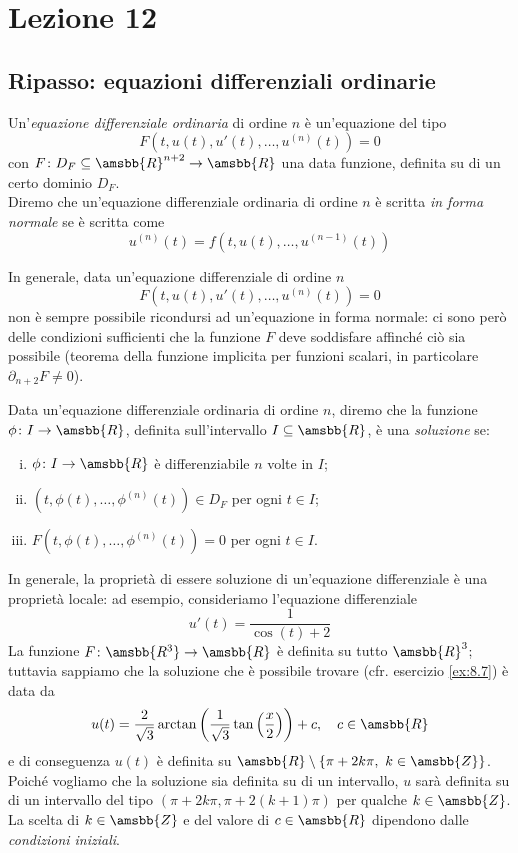 \section{Lezione 12}
\subsection{Ripasso: equazioni differenziali ordinarie}
\begin{definition}
    \label{def:11.1}
    Un'\emph{equazione differenziale ordinaria} di ordine $n$ è un'equazione del tipo
    \[
    F(t, u(t), u'(t), \dots, u^{(n)}(t)) = 0
    \]
    con $F\colon D_F\subseteq \amsbb{R}^{n+2}\to \amsbb{R}$ una data funzione, definita su di un certo dominio $D_F$.\\
    Diremo che un'equazione differenziale ordinaria di ordine $n$ è scritta \emph{in forma normale} se è scritta come
    \[
    u^{(n)}(t) = f(t, u(t), \dots, u^{(n-1)}(t))
    \]
\end{definition}
\begin{remark}
    In generale, data un'equazione differenziale di ordine $n$
    \[
    F(t, u(t), u'(t), \dots, u^{(n)}(t))=0
    \]
    non è sempre possibile ricondursi ad un'equazione in forma normale: ci sono però delle condizioni sufficienti che la funzione $F$ deve soddisfare affinché ciò sia possibile (teorema della funzione implicita per funzioni scalari, in particolare $\partial_{n+2}F \ne 0$).
\end{remark}
\begin{definition}
    \label{def:11.2}
    Data un'equazione differenziale ordinaria di ordine $n$, diremo che la funzione $\phi\colon I \to \amsbb{R}$, definita sull'intervallo $I\subseteq \amsbb{R}$, è una \emph{soluzione} se:
    \begin{enumerate}[(i)]
        \item $\phi\colon I \to \amsbb{R}$ è differenziabile $n$ volte in $I$;
        \item $(t, \phi(t), \dots, \phi^{(n)}(t))\in D_F$ per ogni $t\in I$;
        \item $F(t, \phi(t), \dots, \phi^{(n)}(t))=0$ per ogni $t\in I$.
    \end{enumerate}
\end{definition}
\begin{remark}
    In generale, la proprietà di essere soluzione di un'equazione differenziale è una proprietà locale: ad esempio, consideriamo l'equazione differenziale
    \[
    u'(t) = \frac{1}{\cos(t)+2}
    \]
    La funzione $F\colon \amsbb{R^3}\to \amsbb{R}$ è definita su tutto $\amsbb{R}^3$; tuttavia sappiamo che la soluzione che è possibile trovare (cfr. esercizio \ref{ex:8.7}) è data da
    \[
    u(t) = \frac{2}{\sqrt{3}}\arctan\left(\frac{1}{\sqrt{3}}\tan\left(\frac{x}{2}\right)\right)+c, \quad c\in\amsbb{R}
    \]
    e di conseguenza $u(t)$ è definita su $\amsbb{R}\setminus\{\pi + 2k\pi, \ k\in\amsbb{Z}\}$. Poiché vogliamo che la soluzione sia definita su di un intervallo, $u$ sarà definita su di un intervallo del tipo $(\pi + 2k\pi, \pi + 2(k+1)\pi)$ per qualche $k\in\amsbb{Z}$. La scelta di $k\in\amsbb{Z}$ e del valore di $c\in\amsbb{R}$ dipendono dalle \emph{condizioni iniziali}.
\end{remark}
